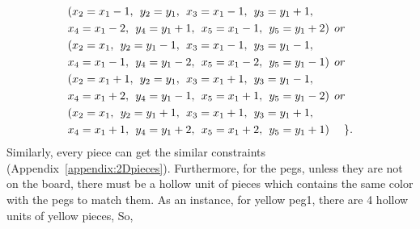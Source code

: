 \begin{equation}
\begin{aligned}
&(x_{2} = x_{1}-1 ,\hspace{1ex}y_{2} = y_{1},\hspace{1ex}x_{3} = x_{1}-1,\hspace{1ex}y_{3} = y_{1}+1,
\\&x_{4} = x_{1}-2,\hspace{1ex}y_{4} = y_{1}+1,\hspace{1ex}x_{5} = x_{1}-1,\hspace{1ex}y_{5} = y_{1}+2)\hspace{1ex} or \\
&(x_{2} = x_{1} ,\hspace{1ex}y_{2} = y_{1}-1,\hspace{1ex}x_{3} = x_{1}-1,\hspace{1ex}y_{3} = y_{1}-1,
\\&x_{4} = x_{1}-1,\hspace{1ex}y_{4} = y_{1}-2,\hspace{1ex}x_{5} = x_{1}-2,\hspace{1ex}y_{5} = y_{1}-1)\hspace{1ex} or \\
&(x_{2} = x_{1}+1 ,\hspace{1ex}y_{2} = y_{1},\hspace{1ex}x_{3} = x_{1}+1,\hspace{1ex}y_{3} = y_{1}-1,
\\&x_{4} = x_{1}+2,\hspace{1ex}y_{4} = y_{1}-1,\hspace{1ex}x_{5} = x_{1}+1,\hspace{1ex}y_{5} = y_{1}-2)\hspace{1ex} or \\
&(x_{2} = x_{1} ,\hspace{1ex}y_{2} = y_{1}+1,\hspace{1ex}x_{3} = x_{1}+1,\hspace{1ex}y_{3} = y_{1}+1,
\\&x_{4} = x_{1}+1,\hspace{1ex}y_{4} = y_{1}+2,\hspace{1ex}x_{5} = x_{1}+2,\hspace{1ex}y_{5} = y_{1}+1)\hspace{3ex}\}.
\end{aligned}
\end{equation}
Similarly, every piece can get the similar constraints (Appendix~\ref{appendix:2Dpieces}). Furthermore, for the pegs, unless they are not on the board, there must be a hollow unit of pieces which contains the same color with the pegs to match them. As an instance, for yellow peg1, there are 4 hollow units of yellow pieces, So,
